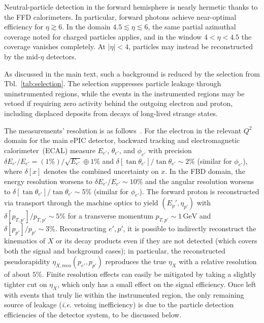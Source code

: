 \documentclass[aps,prd,preprintnumbers,superscriptaddress,nofootinbib,floatfix,twocolumn,notitlepage,reprint]{revtex4-2}
\newcommand{\GeV}{\mathrm{GeV}}
\newcommand{\ie}{\textit{i.e.}}
\begin{document}
Neutral-particle detection in the forward hemisphere is nearly hermetic thanks to the FFD calorimeters.  
In particular, forward photons achieve near-optimal efficiency for $\eta \gtrsim 6$. 
In the domain $4.5 \lesssim \eta \lesssim 6$, the same partial azimuthal coverage noted for charged particles applies, and in the window $4 < \eta < 4.5$ the coverage vanishes completely. 
At $|\eta| < 4$, particles may instead be reconstructed by the mid-$\eta$ detectors.

As discussed in the main text, such a background is reduced by the selection from Tbl.~\ref{tab:selection}. 
The selection suppresses particle leakage through uninstrumented regions, while the events in the instrumented regions may be vetoed if requiring zero activity behind the outgoing electron and proton, including displaced deposits from decays of long-lived strange states. 

The measurements' resolution is as follows~\cite{AbdulKhalek:2021gbh}. For the electron in the relevant $Q^2$ domain for the main ePIC detector, backward tracking and electromagnetic calorimeter~(ECAL) measure $E_{e'}$, $\theta_{e'}$, and $\phi_{e'}$ with precision $\delta E_{e'}/E_{e'} = (1\%)/\sqrt{E_{e'}} \oplus 1\% $ and ${\delta[\tan\theta_{e'}]}/{\tan\theta_{e'}}\sim2\%$ (similar for $\phi_{e'}$), where $\delta[x]$ denotes the combined uncertainty on $x$. In the FBD domain, the energy resolution worsens to $\delta E_{e'}/E_{e'} \sim 10\% $ and the angular resolution worsens to ${\delta[\tan\theta_{e'}]}/{\tan\theta_{e'}}\sim5\%$ (similar for $\phi_{e'}$).
The forward proton is reconstructed via transport through the machine optics to yield $(E_p',\eta_{p'})$ with ${\delta [p_{T, p'}]}/{p_{T, p'}}\sim5\%$ for a transverse momentum $p_{T, p'}\sim 1\,\GeV$ and ${\delta [p_{p'}]}/{p_{p'}}\sim3\%$.
Reconstructing $e',p'$, it is possible to indirectly reconstruct the kinematics of $X$ or its decay products even if they are not detected (which covers both the signal and background cases); in particular, the reconstructed pseudorapidity $\eta_{X,\text{reco}}(p_{e'},p_{p'})$ reproduces the true $\eta_{X}$ with a relative resolution of about $5\%$.
Finite resolution effects can easily be mitigated by taking a slightly tighter cut on $\eta_X$, which only has a small effect on the signal efficiency. 
Once left with events that truly lie within the instrumented region, the only remaining source of leakage (\ie{} vetoing inefficiency) is due to the particle detection efficiencies of the detector system, to be discussed below.
\end{document}
